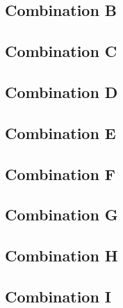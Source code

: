 \documentclass[../../course]{subfiles}
\begin{document}
\subsection{Combination B}
\subsection{Combination C}
\subsection{Combination D}
\subsection{Combination E}
\subsection{Combination F}
\subsection{Combination G}
\subsection{Combination H}
\subsection{Combination I}


\end{document}
